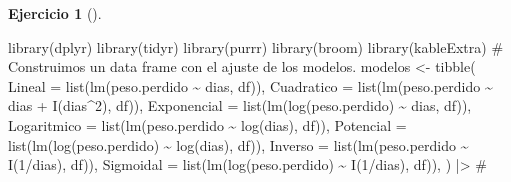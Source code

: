 \documentclass[
  a4paper,
]{scrreport}
\newenvironment{Shaded}{\begin{snugshade}}{\end{snugshade}}
\newcommand{\AttributeTok}[1]{\textcolor[rgb]{0.40,0.45,0.13}{#1}}
\newcommand{\CommentTok}[1]{\textcolor[rgb]{0.37,0.37,0.37}{#1}}
\newcommand{\DecValTok}[1]{\textcolor[rgb]{0.68,0.00,0.00}{#1}}
\newcommand{\FunctionTok}[1]{\textcolor[rgb]{0.28,0.35,0.67}{#1}}
\newcommand{\NormalTok}[1]{\textcolor[rgb]{0.00,0.23,0.31}{#1}}
\newcommand{\OtherTok}[1]{\textcolor[rgb]{0.00,0.23,0.31}{#1}}
\newcommand{\SpecialCharTok}[1]{\textcolor[rgb]{0.37,0.37,0.37}{#1}}
\theoremstyle{definition}
\newtheorem{exercise}{Ejercicio}[chapter]
\theoremstyle{remark}
\begin{document}
\begin{exercise}[]
\begin{enumerate}
  \begin{tcolorbox}[enhanced jigsaw, breakable, toptitle=1mm, colbacktitle=quarto-callout-tip-color!10!white, rightrule=.15mm, opacityback=0, opacitybacktitle=0.6, titlerule=0mm, coltitle=black, colframe=quarto-callout-tip-color-frame, colback=white, bottomtitle=1mm, leftrule=.75mm, toprule=.15mm, title=\textcolor{quarto-callout-tip-color}{\faLightbulb}\hspace{0.5em}{Solución}, arc=.35mm, bottomrule=.15mm, left=2mm]

\begin{Shaded}
\begin{Highlighting}[]
\FunctionTok{library}\NormalTok{(dplyr)}
\FunctionTok{library}\NormalTok{(tidyr)}
\FunctionTok{library}\NormalTok{(purrr)}
\FunctionTok{library}\NormalTok{(broom)}
\FunctionTok{library}\NormalTok{(kableExtra)}
\CommentTok{\# Construimos un data frame con el ajuste de los modelos.}
\NormalTok{modelos }\OtherTok{\textless{}{-}} \FunctionTok{tibble}\NormalTok{(}
        \AttributeTok{Lineal =} \FunctionTok{list}\NormalTok{(}\FunctionTok{lm}\NormalTok{(peso.perdido }\SpecialCharTok{\textasciitilde{}}\NormalTok{ dias, df)),}
        \AttributeTok{Cuadratico =} \FunctionTok{list}\NormalTok{(}\FunctionTok{lm}\NormalTok{(peso.perdido }\SpecialCharTok{\textasciitilde{}}\NormalTok{ dias }\SpecialCharTok{+} \FunctionTok{I}\NormalTok{(dias}\SpecialCharTok{\^{}}\DecValTok{2}\NormalTok{), df)),}
        \AttributeTok{Exponencial =} \FunctionTok{list}\NormalTok{(}\FunctionTok{lm}\NormalTok{(}\FunctionTok{log}\NormalTok{(peso.perdido) }\SpecialCharTok{\textasciitilde{}}\NormalTok{ dias, df)),}
        \AttributeTok{Logaritmico =} \FunctionTok{list}\NormalTok{(}\FunctionTok{lm}\NormalTok{(peso.perdido }\SpecialCharTok{\textasciitilde{}} \FunctionTok{log}\NormalTok{(dias), df)),}
        \AttributeTok{Potencial =} \FunctionTok{list}\NormalTok{(}\FunctionTok{lm}\NormalTok{(}\FunctionTok{log}\NormalTok{(peso.perdido) }\SpecialCharTok{\textasciitilde{}} \FunctionTok{log}\NormalTok{(dias), df)),}
        \AttributeTok{Inverso =} \FunctionTok{list}\NormalTok{(}\FunctionTok{lm}\NormalTok{(peso.perdido }\SpecialCharTok{\textasciitilde{}} \FunctionTok{I}\NormalTok{(}\DecValTok{1}\SpecialCharTok{/}\NormalTok{dias), df)),}
        \AttributeTok{Sigmoidal =} \FunctionTok{list}\NormalTok{(}\FunctionTok{lm}\NormalTok{(}\FunctionTok{log}\NormalTok{(peso.perdido) }\SpecialCharTok{\textasciitilde{}} \FunctionTok{I}\NormalTok{(}\DecValTok{1}\SpecialCharTok{/}\NormalTok{dias), df)),}
\NormalTok{    )  }\SpecialCharTok{|\textgreater{}} 
    \CommentTok{\# }

\end{Highlighting}
\end{Shaded}
\end{tcolorbox}
\end{enumerate}
\end{exercise}
\end{document}
